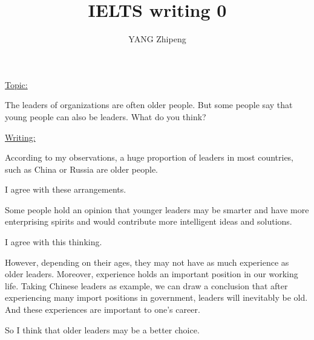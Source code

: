 \documentclass[UTF8]{ctexart}
\title{IELTS writing 0}
\author{YANG Zhipeng}
\date{}
\begin{document}
\maketitle
\thispagestyle{empty}
\LARGE{\underline{Topic:}}

The leaders of organizations are often older people. But some people say that young people can also be leaders. What do you think?

\LARGE{\underline{Writing:}}

According to my observations, a huge proportion of leaders in most countries, such as China or Russia are older people.

I agree with these arrangements.

Some people hold an opinion that younger leaders may be smarter and have more enterprising spirits and would contribute more intelligent ideas and solutions.

I agree with this thinking.

However, depending on their ages, they may not have as much experience as older leaders. Moreover, experience holds an important position in our working life. Taking Chinese leaders as example, we can draw a conclusion that after experiencing many import positions in government, leaders will inevitably be old. And these experiences are important to one's career.

So I think that older leaders may be a better choice.
\end{document}

